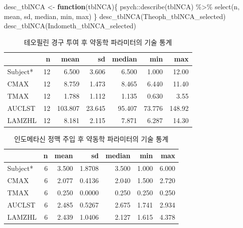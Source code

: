 \documentclass[
  11pt,
  krantz2, a4paper, twoside]{krantz}
\newenvironment{Shaded}{\begin{snugshade}}{\end{snugshade}}
\newcommand{\ControlFlowTok}[1]{\textcolor[rgb]{0.13,0.29,0.53}{\textbf{#1}}}
\newcommand{\FunctionTok}[1]{\textcolor[rgb]{0.00,0.00,0.00}{#1}}
\newcommand{\NormalTok}[1]{#1}
\newcommand{\OtherTok}[1]{\textcolor[rgb]{0.56,0.35,0.01}{#1}}
\newcommand{\SpecialCharTok}[1]{\textcolor[rgb]{0.00,0.00,0.00}{#1}}
\theoremstyle{definition}
\theoremstyle{definition}
\theoremstyle{definition}
\theoremstyle{definition}
\theoremstyle{remark}
\begin{document}
\vspace{-5ex}

\begin{Shaded}
\begin{Highlighting}[]
\NormalTok{desc\_tblNCA }\OtherTok{\textless{}{-}} \ControlFlowTok{function}\NormalTok{(tblNCA)\{}
\NormalTok{  psych}\SpecialCharTok{::}\FunctionTok{describe}\NormalTok{(tblNCA) }\SpecialCharTok{\%\textgreater{}\%}
    \FunctionTok{select}\NormalTok{(n, mean, sd, median, min, max)}
\NormalTok{\}}
\FunctionTok{desc\_tblNCA}\NormalTok{(Theoph\_tblNCA\_selected)}
\FunctionTok{desc\_tblNCA}\NormalTok{(Indometh\_tblNCA\_selected)}
\end{Highlighting}
\end{Shaded}

\begin{table}

\caption{\label{tab:theodesc}테오필린 경구 투여 후 약동학 파라미터의 기술 통계}
\centering
\begin{tabular}[t]{lrrrrrr}
\toprule
  & n & mean & sd & median & min & max\\
\midrule
Subject* & 12 & 6.500 & 3.606 & 6.500 & 1.000 & 12.00\\
CMAX & 12 & 8.759 & 1.473 & 8.465 & 6.440 & 11.40\\
TMAX & 12 & 1.788 & 1.112 & 1.135 & 0.630 & 3.55\\
AUCLST & 12 & 103.807 & 23.645 & 95.407 & 73.776 & 148.92\\
LAMZHL & 12 & 8.181 & 2.115 & 7.871 & 6.287 & 14.30\\
\bottomrule
\end{tabular}
\end{table}

\begin{table}

\caption{\label{tab:indodesc}인도메타신 정맥 주입 후 약동학 파라미터의 기술 통계}
\centering
\begin{tabular}[t]{lrrrrrr}
\toprule
  & n & mean & sd & median & min & max\\
\midrule
Subject* & 6 & 3.500 & 1.8708 & 3.500 & 1.000 & 6.000\\
CMAX & 6 & 2.077 & 0.4136 & 2.040 & 1.500 & 2.720\\
TMAX & 6 & 0.250 & 0.0000 & 0.250 & 0.250 & 0.250\\
AUCLST & 6 & 2.485 & 0.5267 & 2.675 & 1.741 & 2.934\\
LAMZHL & 6 & 2.439 & 1.0406 & 2.127 & 1.615 & 4.378\\
\bottomrule
\end{tabular}
\end{table}
\end{document}
